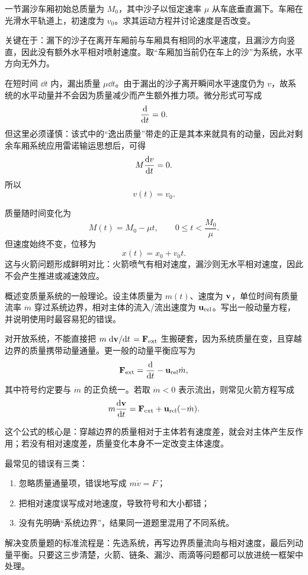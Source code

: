 \begin{problem}
一节漏沙车厢初始总质量为 $M_0$，其中沙子以恒定速率 $\mu$ 从车底垂直漏下。车厢在光滑水平轨道上，初速度为 $v_0$。求其运动方程并讨论速度是否改变。

\begin{solution}
关键在于：漏下的沙子在离开车厢前与车厢具有相同的水平速度，且漏沙方向竖直，因此没有额外水平相对喷射速度。取“车厢加当前仍在车上的沙”为系统，水平方向无外力。

在短时间 $\dd t$ 内，漏出质量 $\mu\dd t$。由于漏出的沙子离开瞬间水平速度仍为 $v$，故系统的水平动量并不会因为质量减少而产生额外推力项。微分形式可写成
\[
\dv{}{t}(Mv)=0.
\]
但这里必须谨慎：该式中的“逸出质量”带走的正是其本来就具有的动量，因此对剩余车厢系统应用雷诺输运思想后，可得
\[
M\dv{v}{t}=0.
\]
所以
\[
v(t)=v_0.
\]

质量随时间变化为
\[
M(t)=M_0-\mu t,
\qquad 0\le t<\frac{M_0}{\mu}.
\]
但速度始终不变，位移为
\[
x(t)=x_0+v_0 t.
\]
这与火箭问题形成鲜明对比：火箭喷气有相对速度，漏沙则无水平相对速度，因此不会产生推进或减速效应。
\end{solution}
\end{problem}

\begin{problem}
概述变质量系统的一般理论。设主体质量为 $m(t)$、速度为 $\vb v$，单位时间有质量流率 $\dot m$ 穿过系统边界，相对主体的流入/流出速度为 $\vb u_\text{rel}$。写出一般动量方程，并说明使用时最容易犯的错误。

\begin{solution}
对开放系统，不能直接把 $m\dv*{\vb v}{t}=\vb F_\text{ext}$ 生搬硬套，因为系统质量在变，且穿越边界的质量携带动量通量。更一般的动量平衡应写为
\[
\vb F_\text{ext}=\dv{}{t}(m\vb v)-\vb u_\text{rel}\dot m,
\]
其中符号约定要与 $\dot m$ 的正负统一。若取 $\dot m<0$ 表示流出，则常见火箭方程写成
\[
m\dv{\vb v}{t}=\vb F_\text{ext}+\vb u_\text{rel}(-\dot m).
\]

这个公式的核心是：穿越边界的质量相对于主体若有速度差，就会对主体产生反作用；若没有相对速度差，质量变化本身不一定改变主体速度。

最常见的错误有三类：
\begin{enumerate}
  \item 忽略质量通量项，错误地写成 $m\dot v=F$；
  \item 把相对速度误写成对地速度，导致符号和大小都错；
  \item 没有先明确“系统边界”，结果同一道题里混用了不同系统。
\end{enumerate}

解决变质量题的标准流程是：先选系统，再写边界质量流向与相对速度，最后列动量平衡。只要这三步清楚，火箭、链条、漏沙、雨滴等问题都可以放进统一框架中处理。
\end{solution}
\end{problem}
